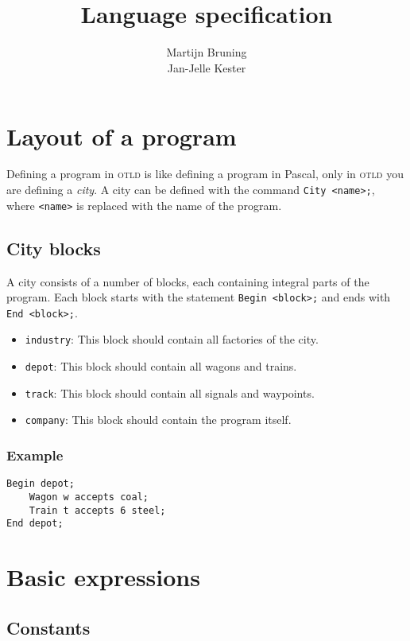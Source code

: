 \documentclass[10pt,a4paper,notitlepage]{article}
\title{\name \\ Language specification}
\author{Martijn Bruning \\ Jan-Jelle Kester}
\newcommand{\shortname}{\textsc{otld} }
\begin{document}
\maketitle

\section{Layout of a program}

Defining a program in \shortname is like defining a program in Pascal, only in \shortname you are defining a \emph{city}. A city can be defined with the command \texttt{City <name>;}, where \texttt{<name>} is replaced with the name of the program.

\subsection{City blocks}

A city consists of a number of blocks, each containing integral parts of the program. Each block starts with the statement \texttt{Begin <block>;} and ends with \texttt{End <block>;}.

\begin{itemize}
\item \texttt{industry}: This block should contain all factories of the city.
\item \texttt{depot}: This block should contain all wagons and trains.
\item \texttt{track}: This block should contain all signals and waypoints.
\item \texttt{company}: This block should contain the program itself.
\end{itemize}

\subsubsection*{Example}

\begin{lstlisting}
Begin depot;
	Wagon w accepts coal;
	Train t accepts 6 steel;
End depot;
\end{lstlisting}

\section{Basic expressions}

\subsection{Constants}
\end{document}

